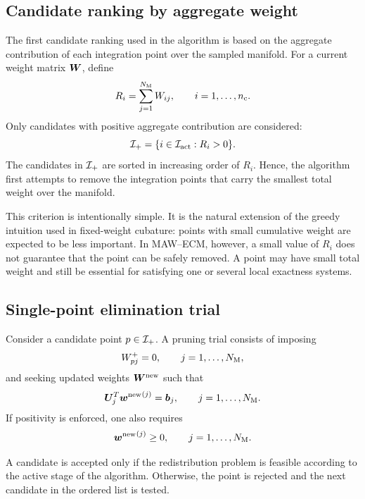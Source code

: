 \documentclass[11pt,a4paper]{article}
\begin{document}
\subsection{Candidate ranking by aggregate weight}

The first candidate ranking used in the algorithm is based on the aggregate
contribution of each integration point over the sampled manifold. For a current
weight matrix $\bm W$, define
\[
        R_i
        =
        \sum_{j=1}^{N_{\mathrm{M}}} W_{ij},
        \qquad
        i=1,\ldots,n_{\mathrm{c}}.
        \label{eq:aggregate_weight}
\]
Only candidates with positive aggregate contribution are considered:
\[
        \mathcal{I}_{+}
        =
        \{i\in\mathcal{I}_{\mathrm{act}} : R_i>0\}.
\]
The candidates in $\mathcal{I}_{+}$ are sorted in increasing order of $R_i$. Hence, the
algorithm first attempts to remove the integration points that carry the
smallest total weight over the manifold.

This criterion is intentionally simple. It is the natural extension of the
greedy intuition used in fixed-weight cubature: points with small cumulative
weight are expected to be less important. In MAW--ECM, however, a small value of
$R_i$ does not guarantee that the point can be safely removed. A point may have
small total weight and still be essential for satisfying one or several local
exactness systems.

\subsection{Single-point elimination trial}

Consider a candidate point $p\in\mathcal{I}_{+}$. A pruning trial consists of imposing
\[
        W_{pj}^{+}=0,
        \qquad
        j=1,\ldots,N_{\mathrm{M}},
        \label{eq:global_prune_constraint}
\]
and seeking updated weights $\bm W^{\mathrm{new}}$ such that
\[
        \bm U_j^T{\bm w^{\mathrm{new}}}^{(j)}=\bm b_j,
        \qquad
        j=1,\ldots,N_{\mathrm{M}}.
        \label{eq:post_prune_exactness}
\]
If positivity is enforced, one also requires
\[
        {\bm w^{\mathrm{new}}}^{(j)}\geq 0,
        \qquad
        j=1,\ldots,N_{\mathrm{M}}.
        \label{eq:post_prune_positivity}
\]

A candidate is accepted only if the redistribution problem is feasible according
to the active stage of the algorithm. Otherwise, the point is rejected and the
next candidate in the ordered list is tested.
\end{document}
